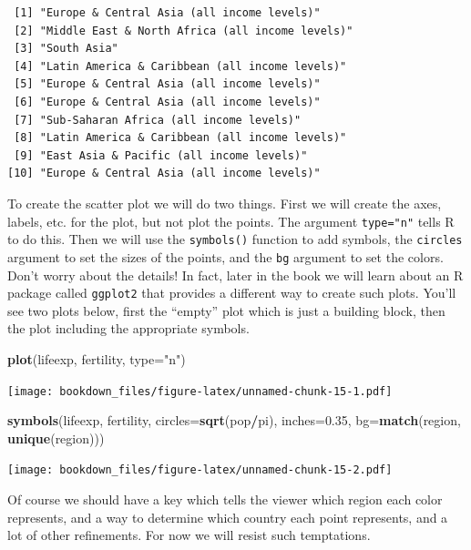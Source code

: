 \documentclass[
]{krantz}
\makeatletter
\newenvironment{Shaded}{\begin{snugshade}}{\end{snugshade}}
\newcommand{\DataTypeTok}[1]{\textcolor[rgb]{0.27,0.27,0.27}{#1}}
\newcommand{\FloatTok}[1]{\textcolor[rgb]{0.06,0.06,0.06}{#1}}
\newcommand{\KeywordTok}[1]{\textcolor[rgb]{0.27,0.27,0.27}{\textbf{#1}}}
\newcommand{\NormalTok}[1]{#1}
\newcommand{\OperatorTok}[1]{\textcolor[rgb]{0.43,0.43,0.43}{\textbf{#1}}}
\newcommand{\StringTok}[1]{\textcolor[rgb]{0.5,0.5,0.5}{#1}}
\newenvironment{kframe}{%
\medskip{}
\setlength{\fboxsep}{.8em}
 \def\at@end@of@kframe{}%
 \ifinner\ifhmode%
  \def\at@end@of@kframe{\end{minipage}}%
  \begin{minipage}{\columnwidth}%
 \fi\fi%
 \def\FrameCommand##1{\hskip\@totalleftmargin \hskip-\fboxsep
 \colorbox{shadecolor}{##1}\hskip-\fboxsep
     \hskip-\linewidth \hskip-\@totalleftmargin \hskip\columnwidth}%
 \MakeFramed {\advance\hsize-\width
   \@totalleftmargin\z@ \linewidth\hsize
   \@setminipage}}%
 {\par\unskip\endMakeFramed%
 \at@end@of@kframe}
\renewenvironment{Shaded}{\begin{kframe}}{\end{kframe}}
\makeatother
\begin{document}
\begin{verbatim}
 [1] "Europe & Central Asia (all income levels)"     
 [2] "Middle East & North Africa (all income levels)"
 [3] "South Asia"                                    
 [4] "Latin America & Caribbean (all income levels)" 
 [5] "Europe & Central Asia (all income levels)"     
 [6] "Europe & Central Asia (all income levels)"     
 [7] "Sub-Saharan Africa (all income levels)"        
 [8] "Latin America & Caribbean (all income levels)" 
 [9] "East Asia & Pacific (all income levels)"       
[10] "Europe & Central Asia (all income levels)"     
\end{verbatim}

To create the scatter plot we will do two things. First we will create the axes, labels, etc. for the plot, but not plot the points. The argument \texttt{type="n"} tells R to do this. Then we will use the \texttt{symbols()} function to add symbols, the \texttt{circles} argument to set the sizes of the points, and the \texttt{bg} argument to set the colors. Don't worry about the details! In fact, later in the book we will learn about an R package called
\texttt{ggplot2} that provides a different way to create such plots. You'll see two plots below, first the ``empty'' plot which is just a building block, then the plot including the appropriate symbols.

\begin{Shaded}
\begin{Highlighting}[]
\KeywordTok{plot}\NormalTok{(lifeexp, fertility, }\DataTypeTok{type=}\StringTok{"n"}\NormalTok{)}
\end{Highlighting}
\end{Shaded}

\texttt{[image: bookdown\_files/figure-latex/unnamed-chunk-15-1.pdf]}

\begin{Shaded}
\begin{Highlighting}[]
\KeywordTok{symbols}\NormalTok{(lifeexp, fertility, }\DataTypeTok{circles=}\KeywordTok{sqrt}\NormalTok{(pop}\OperatorTok{/}\NormalTok{pi), }\DataTypeTok{inches=}\FloatTok{0.35}\NormalTok{, }
        \DataTypeTok{bg=}\KeywordTok{match}\NormalTok{(region, }\KeywordTok{unique}\NormalTok{(region)))}
\end{Highlighting}
\end{Shaded}

\texttt{[image: bookdown\_files/figure-latex/unnamed-chunk-15-2.pdf]}

Of course we should have a key which tells the viewer which region each color represents, and a way to determine which country each point represents, and a lot of other refinements. For now we will resist such temptations.
\end{document}
